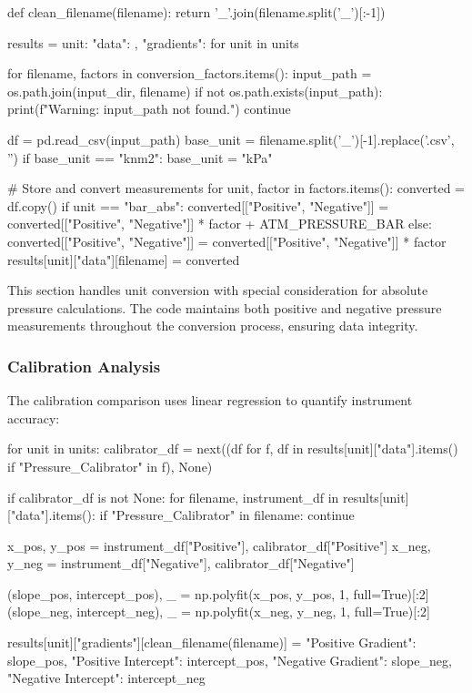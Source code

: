 \documentclass{article}
\begin{document}
\begin{python}
def clean_filename(filename):
    return '_'.join(filename.split('_')[:-1])

results = {unit: {"data": {}, "gradients": {}} for unit in units}

for filename, factors in conversion_factors.items():
    input_path = os.path.join(input_dir, filename)
    if not os.path.exists(input_path):
        print(f"Warning: {input_path} not found.")
        continue
        
    df = pd.read_csv(input_path)
    base_unit = filename.split('_')[-1].replace('.csv', '')
    if base_unit == "knm2":
        base_unit = "kPa"
    
    # Store and convert measurements
    for unit, factor in factors.items():
        converted = df.copy()
        if unit == "bar_abs":
            converted[["Positive", "Negative"]] = converted[["Positive", "Negative"]] * factor + ATM_PRESSURE_BAR
        else:
            converted[["Positive", "Negative"]] = converted[["Positive", "Negative"]] * factor
        results[unit]["data"][filename] = converted
\end{python}

This section handles unit conversion with special consideration for absolute pressure calculations. The code maintains both positive and negative pressure measurements throughout the conversion process, ensuring data integrity.
\subsubsection{Calibration Analysis}
The calibration comparison uses linear regression to quantify instrument accuracy:

\begin{python}
for unit in units:
    calibrator_df = next((df for f, df in results[unit]["data"].items() 
                        if "Pressure_Calibrator" in f), None)
    
    if calibrator_df is not None:
        for filename, instrument_df in results[unit]["data"].items():
            if "Pressure_Calibrator" in filename:
                continue
                
            x_pos, y_pos = instrument_df["Positive"], calibrator_df["Positive"]
            x_neg, y_neg = instrument_df["Negative"], calibrator_df["Negative"]
            
            (slope_pos, intercept_pos), _ = np.polyfit(x_pos, y_pos, 1, full=True)[:2]
            (slope_neg, intercept_neg), _ = np.polyfit(x_neg, y_neg, 1, full=True)[:2]
            
            results[unit]["gradients"][clean_filename(filename)] = {
                "Positive Gradient": slope_pos,
                "Positive Intercept": intercept_pos,
                "Negative Gradient": slope_neg,
                "Negative Intercept": intercept_neg
            }
\end{python}
\end{document}
